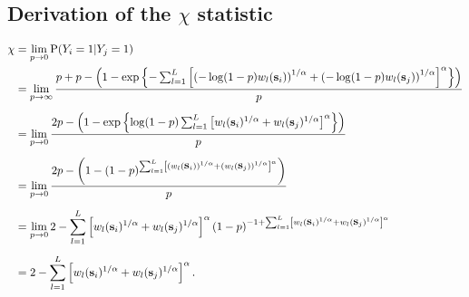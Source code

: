 \documentclass[11pt]{article}
\begin{document}
\subsection{Derivation of the $\chi$ statistic}\label{a:chi}
\begin{align} \label{chi}
  \chi &= \lim_{p \rightarrow 0 }\text{P}(Y_i = 1|Y_j = 1)\nonumber \\
   &= \lim_{p \rightarrow \infty }\frac{ p + p - \left( 1 - \exp \left \{ - \sum_{ l = 1 }^{ L } \left[ \left( -\log(1-p) w_{l}(\mbox{\bf s}_i) \right)^{ 1/\alpha } + \left( -\log(1 - p) w_{ l}(\mbox{\bf s}_j) \right)^{ 1/\alpha } \right]^{\alpha} \right \} \right) }{ p } \nonumber \\[0.5em]
  &= \lim_{p \rightarrow 0 } \frac{ 2p - \left( 1 - \exp \left \{ \log(1-p) \sum_{ l = 1 }^{ L } \left[  w_{l}(\mbox{\bf s}_i) ^{ 1/\alpha } +  w_{ l}(\mbox{\bf s}_j) ^{ 1/\alpha } \right]^{\alpha} \right \} \right) }{ p } \nonumber \\[0.5em]
  &= \lim_{p \rightarrow 0 } \frac{ 2p - \left( 1 - (1-p)^{ \sum_{ l = 1 }^{ L } \left[ \left( w_{l}(\mbox{\bf s}_i) \right)^{ 1/\alpha } + \left( w_{ l}(\mbox{\bf s}_j) \right)^{ 1/\alpha } \right]^\alpha } \right) }{ p } \nonumber \\[0.5em]
  &=\lim_{p \rightarrow 0 } 2 -\sum_{ l = 1 }^{ L } \left[ w_{l}(\mbox{\bf s}_i) ^{ 1/\alpha } +  w_{ l} (\mbox{\bf s}_j)^{ 1/\alpha } \right]^\alpha ( 1 - p)^{ -1 + \sum_{ l = 1 }^{ L } \left[  w_{l}(\mbox{\bf s}_i) ^{ 1/\alpha } +  w_{ l}(\mbox{\bf s}_j)^{ 1/\alpha } \right]^\alpha } \nonumber \\[0.5em]
  &= 2 -  \sum_{ l = 1 }^{ L } \left[ w_{l}(\mbox{\bf s}_i)^{ 1/\alpha } +  w_{ l}(\mbox{\bf s}_j) ^{ 1/\alpha } \right]^\alpha.
\end{align}

\begin{singlespace}


\end{singlespace}
\end{document}
